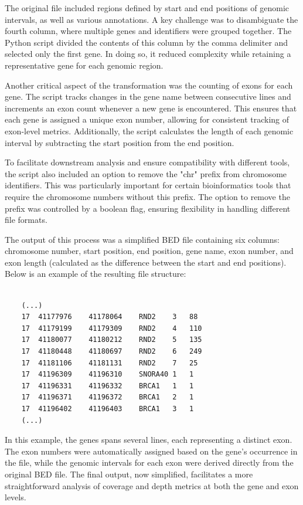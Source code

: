 The original file included regions defined by start and end positions of genomic intervals, as well as various annotations. A key challenge was to disambiguate the fourth column, where multiple genes and identifiers were grouped together. The Python script divided the contents of this column by the comma delimiter and selected only the first gene. In doing so, it reduced complexity while retaining a representative gene for each genomic region.

Another critical aspect of the transformation was the counting of exons for each gene. The script tracks changes in the gene name between consecutive lines and increments an exon count whenever a new gene is encountered. This ensures that each gene is assigned a unique exon number, allowing for consistent tracking of exon-level metrics. Additionally, the script calculates the length of each genomic interval by subtracting the start position from the end position.

To facilitate downstream analysis and ensure compatibility with different tools, the script also included an option to remove the "chr" prefix from chromosome identifiers. This was particularly important for certain bioinformatics tools that require the chromosome numbers without this prefix. The option to remove the prefix was controlled by a boolean flag, ensuring flexibility in handling different file formats.

The output of this process was a simplified BED file containing six columns: chromosome number, start position, end position, gene name, exon number, and exon length (calculated as the difference between the start and end positions). Below is an example of the resulting file structure:

\begin{verbatim}
    
    (...)
    17	41177976	41178064	RND2	3	88
    17	41179199	41179309	RND2	4	110
    17	41180077	41180212	RND2	5	135
    17	41180448	41180697	RND2	6	249
    17	41181106	41181131	RND2	7	25
    17	41196309	41196310	SNORA40	1	1
    17	41196331	41196332	BRCA1	1	1
    17	41196371	41196372	BRCA1	2	1
    17	41196402	41196403	BRCA1	3	1
    (...)
\end{verbatim}

In this example, the genes spans several lines, each representing a distinct exon. The exon numbers were automatically assigned based on the gene's occurrence in the file, while the genomic intervals for each exon were derived directly from the original BED file. The final output, now simplified, facilitates a more straightforward analysis of coverage and depth metrics at both the gene and exon levels.

